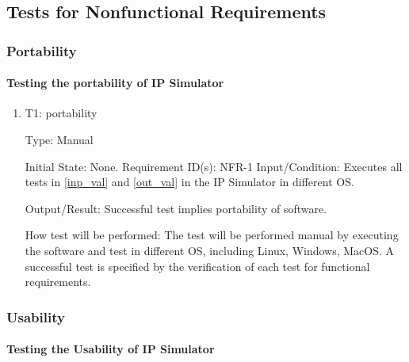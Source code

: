\documentclass[12pt, titlepage]{article}
\begin{document}
\subsection{Tests for Nonfunctional Requirements}

\subsubsection{Portability\label{nfr1}}

\paragraph{Testing the portability of IP Simulator}

\begin{enumerate}

\item{T1: portability\\}

Type: Manual
					
Initial State: None. 
Requirement ID(s): NFR-1					
Input/Condition: Executes all tests in \ref{inp_val} and \ref{out_val} in the IP Simulator in different OS.
					
Output/Result: Successful test implies portability of software.

How test will be performed: The test will be performed manual by executing the software and test in different OS, including Linux,
Windows, MacOS. A successful test is specified by the verification of
each test for functional requirements. 
				
\end{enumerate}
\subsubsection{Usability\label{nfr2}}

\paragraph{Testing the Usability of IP Simulator}
\end{document}
